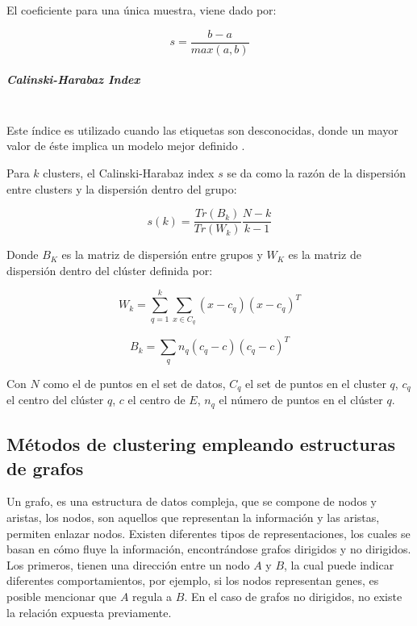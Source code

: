 El coeficiente para una única muestra, viene dado por:

\begin{equation}	
	s = \frac{b - a}{max(a, b)}
\end{equation}

\subparagraph{Calinski-Harabaz Index\\\\}

Este índice es utilizado cuando las etiquetas son desconocidas, donde un mayor valor de éste implica un modelo mejor definido \cite{calinski1974dendrite}.

Para $k$ clusters, el Calinski-Harabaz index $s$ se da como la razón de la dispersión entre clusters y la dispersión dentro del grupo:

\begin{equation}
	s(k) = \frac{Tr(B_k)}{Tr(W_k)}  \frac{N - k}{k - 1}
\end{equation}


Donde $B_{K}$ es la matriz de dispersión entre grupos y $W_{K}$ es la matriz de dispersión dentro del clúster definida por:

\begin{equation}	
	W_k = \sum_{q=1}^k \sum_{x \in C_q} (x - c_q) (x - c_q)^T
\end{equation}

\begin{equation}
	B_k = \sum_q n_q (c_q - c) (c_q - c)^T
\end{equation}

Con $N$ como el de puntos en el set de datos, $C_{q}$ el set de puntos en el cluster $q$, $c_{q}$ el centro del clúster $q$, $c$ el centro de $E$, $n_{q}$ el número de puntos en el clúster $q$.

\subsection{Métodos de clustering empleando estructuras de grafos}

Un grafo, es una estructura de datos compleja, que se compone de nodos y aristas, los nodos, son aquellos que representan la información y las aristas, permiten enlazar nodos. Existen diferentes tipos de representaciones, los cuales se basan en cómo fluye la información, encontrándose grafos dirigidos y no dirigidos. Los primeros, tienen una dirección entre un nodo $A$ y $B$, la cual puede indicar diferentes comportamientos, por ejemplo, si los nodos representan genes, es posible mencionar que $A$ regula a $B$. En el caso de grafos no dirigidos, no existe la relación expuesta previamente.

